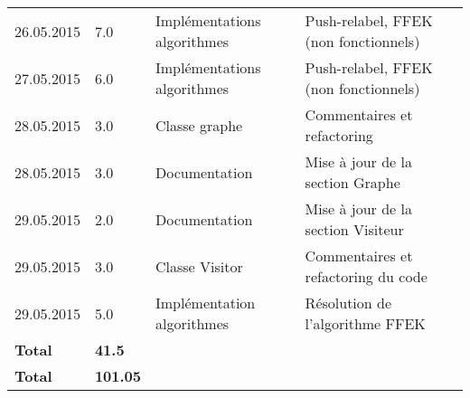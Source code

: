 \documentclass[french]{article}
\begin{document}
\begin{longtable}{p{}|p{}|p{}|p{}}
		26.05.2015 & 7.0 & Implémentations algorithmes & Push-relabel, FFEK (non fonctionnels)\\
		27.05.2015 & 6.0 & Implémentations algorithmes & Push-relabel, FFEK (non fonctionnels)\\
		28.05.2015 & 3.0 & Classe graphe & Commentaires et refactoring\\
		28.05.2015 & 3.0 & Documentation & Mise à jour de la section Graphe\\
		29.05.2015 & 2.0 & Documentation & Mise à jour de la section Visiteur\\
		29.05.2015 & 3.0 & Classe Visitor & Commentaires et refactoring du code\\
		29.05.2015 & 5.0 & Implémentation algorithmes & Résolution de l'algorithme FFEK\\
		\textbf{Total} & \textbf{41.5} &&\\
		\hline
		\textbf{Total} & \textbf{101.05} &&\\
	\end{longtable}
	
\end{document}
